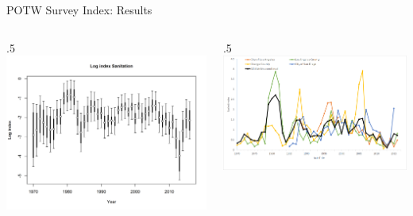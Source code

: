 \documentclass[ignorenonframetext,compress]{beamer}
\def\begincols{\begin{columns}}
\def\begincol{\begin{column}}
\def\endcol{\end{column}}
\def\endcols{\end{columns}}
\begin{document}
\begin{frame}{POTW Survey Index: Results}

\begincols
 \begincol{.5\textwidth}
\includegraphics{r4ss/plots_mod1/index4_logcpuedata_Sanitation.png}
\endcol
 \begincol{.5\textwidth}
\includegraphics{Figures/Fleet7_Sanitation_indexcompare.png}

\endcol
\endcols

\end{frame}
\end{document}
